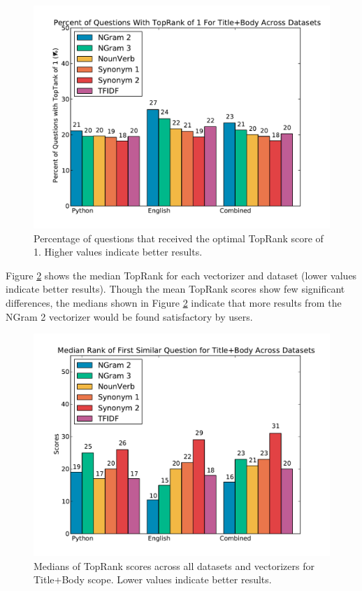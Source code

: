 \documentclass{acm_proc_article-sp}
\begin{document}
\begin{figure}[h]
\centering
\includegraphics[width=1\columnwidth]{images/all-percent@rank1-by-dataset_plot.pdf}
\caption{Percentage of questions that received the optimal TopRank score of 1. Higher values indicate better results.}
\label{fig:allpercent}
\end{figure}
	
Figure \ref{fig:allmedians} shows the median TopRank for each vectorizer and dataset (lower values indicate better results). Though the mean TopRank scores show few significant differences, the medians shown in Figure \ref{fig:allmedians} indicate that more results from the NGram 2 vectorizer would be found satisfactory by users.

\begin{figure}[h]
\centering
\includegraphics[width=1\columnwidth]{images/all-median-topRanks-by-dataset_plot.pdf}
\caption{Medians of TopRank scores across all datasets and vectorizers for Title+Body scope. Lower values indicate better results.}
\label{fig:allmedians}
\end{figure}
\end{document}
